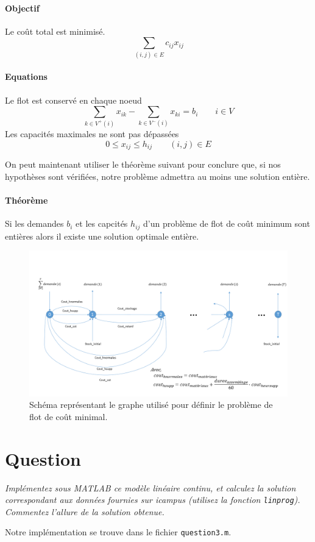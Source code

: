 \documentclass[12pt,oneside,a4paper]{article}
\newcommand{\question}
{
\addtocounter{section}{1}
\section*{Question \thesection}
}
\begin{document}
\paragraph{Objectif}
Le coût total est minimisé.
\[ \sum_{(i, j) \in E} c_{ij} x_{ij} \]
\paragraph{Equations} Le flot est conservé en chaque noeud
\[ \sum_{k \in V^{+}(i)} x_{ik} - \sum_{k \in V^{-}(i)} x_{ki} 
  = b_i \qquad i \in V
\]
Les capacités maximales ne sont pas dépassées
\[ 0 \leq x_{ij} \leq h_{ij} \qquad (i, j) \in E \]

On peut maintenant utiliser le théorème suivant pour conclure que, si nos hypothèses sont vérifiées, notre problème admettra au moins une solution entière.
\paragraph{Théorème}
Si les demandes $b_i$ et les capcités $h_{ij}$ d'un problème de flot de coût minimum sont entières alors il existe une solution optimale entière.

\begin{figure}[hp]
	\centering
		\includegraphics[scale = 0.5]{Schema_flot.png}
	\caption{Schéma représentant le graphe utilisé pour définir 
  le problème de flot de coût minimal.}
	\label{fig:schemaFlot}
\end{figure}

\question %
\emph{Implémentez sous MATLAB ce modèle linéaire continu, 
et calculez la solution correspondant aux données fournies sur icampus 
(utilisez la fonction \texttt{linprog}). 
Commentez l'allure de la solution obtenue.}

Notre implémentation se trouve dans le fichier \texttt{question3.m}.
\end{document}
